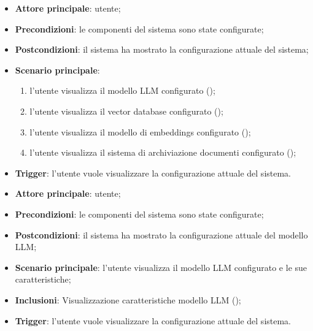 \documentclass[10pt, a4paper]{article}
\begin{document}
    \begin{itemize}
        \item \textbf{Attore principale}: utente;
        \item \textbf{Precondizioni}: le componenti del sistema sono state configurate;
        \item \textbf{Postcondizioni}: il sistema ha mostrato la configurazione attuale del sistema;
        \item \textbf{Scenario principale}:
            \begin{enumerate}
                \item l’utente visualizza il modello LLM configurato ();
                \item l’utente visualizza il vector database configurato ();
                \item l’utente visualizza il modello di embeddings configurato ();
                \item l’utente visualizza il sistema di archiviazione documenti configurato ();
            \end{enumerate}
        \item \textbf{Trigger}: l’utente vuole visualizzare la configurazione attuale del sistema.
    \end{itemize}

    \begin{itemize}
        \item \textbf{Attore principale}: utente;
        \item \textbf{Precondizioni}: le componenti del sistema sono state configurate;
        \item \textbf{Postcondizioni}: il sistema ha mostrato la configurazione attuale del modello LLM;
        \item \textbf{Scenario principale}: l’utente visualizza il modello LLM configurato e le sue caratteristiche;
        \item \textbf{Inclusioni}: Visualizzazione caratteristiche modello LLM ();
        \item \textbf{Trigger}: l’utente vuole visualizzare la configurazione attuale del sistema.
    \end{itemize}
\end{document}

